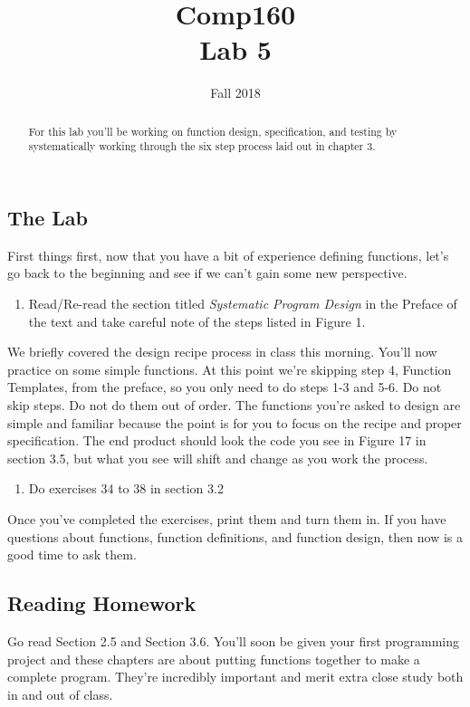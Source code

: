 \documentclass[nobib]{tufte-handout}
\title{Comp160 \\ Lab 5 }
\author{}
\date{ Fall 2018 }
\begin{document}
\maketitle

\begin{abstract}
  For this lab you'll be working on function design, specification, and testing by systematically working through the six step process laid out in chapter 3.
\end{abstract}

\subsection*{The Lab}

First things first, now that you have a bit of experience defining functions, let's go back to the beginning and see if we can't gain some new perspective.
\begin{enumerate}
  \item Read/Re-read  the section titled \textit{Systematic Program Design} in the Preface of the text and take careful note of the steps listed in Figure 1.
\end{enumerate}

We briefly covered the design recipe process in class this morning. You'll now practice on some simple functions. At this point we're skipping step 4, Function Templates, from the preface, so you only need to do steps 1-3 and 5-6.  Do not skip steps. Do not do them out of order.  The functions you're asked to design are simple and familiar because the point is for you to focus on the recipe and proper specification.  The end product should look the code you see in Figure 17 in section 3.5, but what you see will shift and change as you work the process.
\begin{enumerate}[resume]
  \item Do exercises 34 to 38 in section 3.2
\end{enumerate}
Once you've completed the exercises, print them and turn them in. If you have questions about functions, function definitions, and function design, then now is a good time to ask them.

\subsection*{Reading Homework}

Go read Section 2.5 and Section 3.6. You'll soon be given your first programming project and these chapters are about putting functions together to make a complete program. They're incredibly important and merit extra close study both in and out of class.
\end{document}
